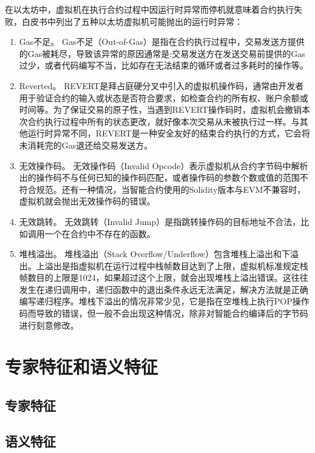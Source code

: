在以太坊中，虚拟机在执行合约过程中因运行时异常而停机就意味着合约执行失败，白皮书中列出了五种以太坊虚拟机可能抛出的运行时异常：
\begin{enumerate}[label=(\arabic*)]
    \item Gas不足。
    Gas不足（Out-of-Gas）是指在合约执行过程中，交易发送方提供的Gas被耗尽，导致该异常的原因通常是:交易发送方在发送交易前提供的Gas过少，或者代码编写不当，比如存在无法结束的循环或者过多耗时的操作等。
    \item Reverted。
    REVERT是拜占庭硬分叉中引入的虚拟机操作码，通常由开发者用于验证合约的输入或状态是否符合要求，如检查合约的所有权、账户余额或时间等。为了保证交易的原子性，当遇到REVERT操作码时，虚拟机会撤销本次合约执行过程中所有的状态更改，就好像本次交易从未被执行过一样。与其他运行时异常不同，REVERT是一种安全友好的结束合约执行的方式，它会将未消耗完的Gas退还给交易发送方。
    \item 无效操作码。
    无效操作码（Invalid Opcode）表示虚拟机从合约字节码中解析出的操作码不与任何已知的操作码匹配，或者操作码的参数个数或值的范围不符合规范。还有一种情况，当智能合约使用的Solidity版本与EVM不兼容时，虚拟机就会抛出无效操作码的错误。
    \item 无效跳转。
    无效跳转（Invalid Jump）是指跳转操作码的目标地址不合法，比如调用一个在合约中不存在的函数。
    \item 堆栈溢出。
    堆栈溢出（Stack Overflow/Underflow）包含堆栈上溢出和下溢出。上溢出是指虚拟机在运行过程中栈帧数目达到了上限，虚拟机标准规定栈帧数目的上限是1024，如果超过这个上限，就会出现堆栈上溢出错误。这往往发生在递归调用中，递归函数中的退出条件永远无法满足，解决方法就是正确编写递归程序。堆栈下溢出的情况非常少见，它是指在空堆栈上执行POP操作码而导致的错误，但一般不会出现这种情况，除非对智能合约编译后的字节码进行刻意修改。
\end{enumerate}

\section{专家特征和语义特征}
\subsection{专家特征}
\subsection{语义特征}
